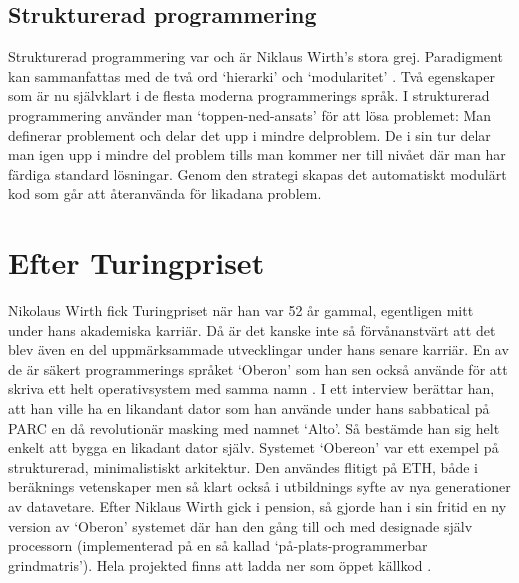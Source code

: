 \subsection{Strukturerad programmering}
Strukturerad programmering var och är Niklaus Wirth's stora
grej. Paradigment kan sammanfattas med de två ord `hierarki' och
`modularitet' \cite{algorithms}. Två egenskaper som är nu självklart i de flesta moderna
programmerings språk. I strukturerad programmering använder man
`toppen-ned-ansats'
för att lösa problemet: Man definerar problement och delar det upp i
mindre delproblem. De i sin tur delar man igen upp i mindre del
problem tills man kommer ner till nivået där man har färdiga standard
lösningar. Genom den strategi skapas det automatiskt modulärt kod
som går att återanvända för likadana problem.

\section{Efter Turingpriset}
Nikolaus Wirth fick Turingpriset när han var 52 år gammal, egentligen
mitt under hans akademiska karriär. Då är det kanske inte så 
förvånanstvärt att det blev även en del uppmärksammade utvecklingar 
under hans senare karriär. En av de är säkert programmerings språket
`Oberon' som han sen också använde för att skriva ett helt
operativsystem med samma namn \cite{oberon}. I ett interview berättar han, att han
ville ha en likandant dator som han använde under hans sabbatical på 
PARC en då revolutionär masking med namnet `Alto'. Så bestämde han sig
helt enkelt att bygga en likadant dator själv. Systemet `Obereon' var
ett exempel på strukturerad, minimalistiskt arkitektur. Den användes
flitigt på ETH, både i beräknings vetenskaper men så klart också i 
utbildnings syfte av nya generationer av datavetare. Efter Niklaus
Wirth gick i pension, så gjorde han i sin fritid en ny version av
`Oberon' systemet där han den gång till och med designade själv
processorn (implementerad på en så kallad `på-plats-programmerbar 
grindmatris'). Hela projekted finns att ladda ner som öppet källkod \cite{oberonDown}. 
 

